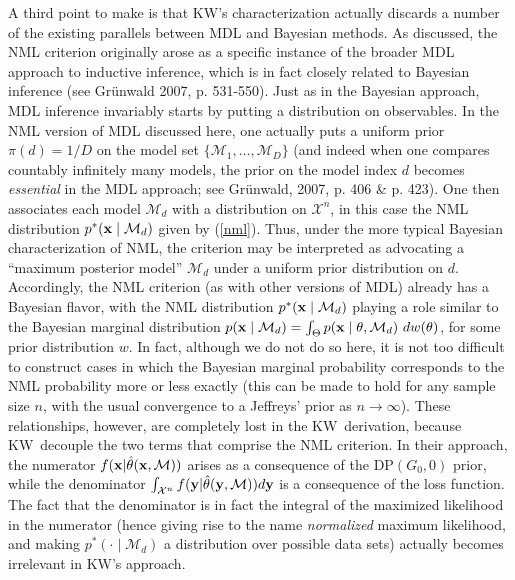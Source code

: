 \documentclass[authoryear]{elsarticle}
\newcommand{\condon}{|}
\newcommand{\model}{\mathcal{M}}
\newcommand{\sspace}[2]{\mathcal{#1}^{#2}}
\newcommand{\kw}{KW}
\newcommand{\vx}{\ensuremath{{\bf x}}}
\newcommand{\vy}{\ensuremath{{\bf y}}}
\begin{document}
A third point to make is that \kw's characterization actually discards
a number of the existing parallels between MDL and Bayesian methods.
As discussed, the NML criterion originally arose as a specific instance
of the broader MDL approach to inductive inference, which is
in fact closely related to Bayesian inference (see Gr\"unwald
2007, p. 531-550). Just as in the Bayesian approach, MDL inference
invariably starts by putting a distribution on observables. In the NML
version of MDL discussed here, one actually puts a uniform prior
$\pi(d) = 1/D$ on the model set $\{ \model_1, \ldots, \model_D \}$
(and indeed when one compares countably infinitely many models,
the prior on the model index $d$  becomes {\em essential\/} in the
MDL approach; see Gr\"unwald, 2007, p. 406 \& p. 423).
One then associates each model $\model_d$ with a distribution on
$\sspace{X}{n}$, in this case the NML distribution $p^*(\vx \mid
\model_d)$ given by (\ref{nml}). Thus, under the more typical Bayesian
characterization of NML, the criterion may be
interpreted as advocating a ``maximum posterior model'' $\model_d$
under a uniform prior distribution on $d$.
Accordingly, the NML criterion (as with other versions of MDL)
already has a Bayesian flavor, with the NML distribution
$p^*(\vx \mid \model_d)$ playing a role similar to the
Bayesian marginal distribution $p(\vx \mid \model_d) = \int_\Theta p(\vx \mid
\theta, \model_d) \ d w(\theta)$, for some prior distribution $w$. In fact,
although we do not do so here, it is not too difficult to construct
cases in which the Bayesian marginal probability corresponds to the
NML probability more or less exactly (this can be made to hold for any sample
size $n$, with the usual convergence to a Jeffreys' prior as $n \rightarrow \infty$).
 These relationships, however,
are completely lost in the \kw\ derivation, because \kw\
decouple the two terms that
comprise the NML criterion. In their approach, the numerator $f(\vx
\condon \hat{\theta}(\vx,\model))$ arises as a consequence of the
DP$(G_0,0)$ prior, while the denominator $\int_{\sspace{X}{n}} f(\vy
\condon \hat{\theta}(\vy,\model)) d\vy$ is a consequence of the loss
function. The fact that the denominator is in fact the integral of the
maximized likelihood in the numerator (hence giving rise to the name
{\it normalized} maximum likelihood, and making $p^*(\cdot \mid
\model_d)$ a distribution over possible data sets) actually becomes irrelevant in \kw's approach.
\end{document}
